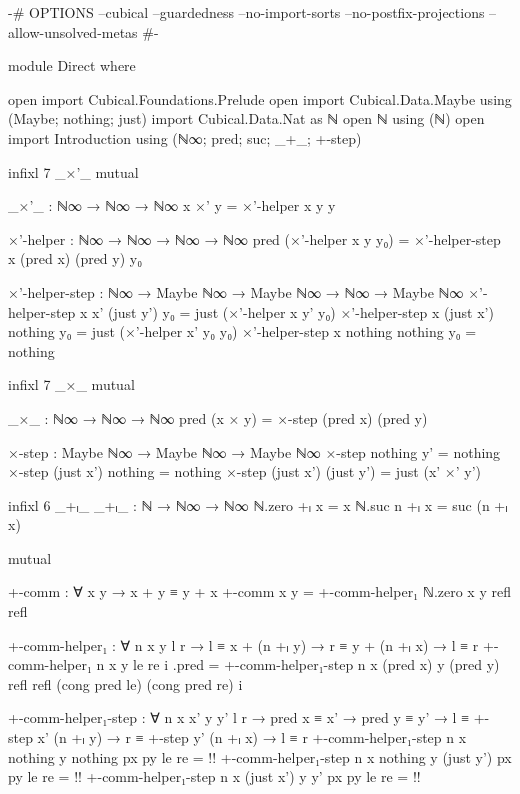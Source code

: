 \begin{code}[hide]
{-# OPTIONS --cubical --guardedness --no-import-sorts --no-postfix-projections --allow-unsolved-metas #-}

module Direct where

open import Cubical.Foundations.Prelude
open import Cubical.Data.Maybe using (Maybe; nothing; just)
import Cubical.Data.Nat as ℕ
open ℕ using (ℕ)
open import Introduction using (ℕ∞; pred; suc; _+_; +-step)
\end{code}
\begin{code}[hide]
infixl 7 _×'_
mutual
\end{code}
\begin{code}
  _×'_ : ℕ∞ → ℕ∞ → ℕ∞
  x ×' y = ×'-helper x y y

  ×'-helper : ℕ∞ → ℕ∞ → ℕ∞ → ℕ∞
  pred (×'-helper x y y₀) =
    ×'-helper-step x (pred x) (pred y) y₀

  ×'-helper-step :
    ℕ∞ → Maybe ℕ∞ → Maybe ℕ∞ → ℕ∞ →
    Maybe ℕ∞
  ×'-helper-step x x' (just y') y₀ =
    just (×'-helper x y' y₀)
  ×'-helper-step x (just x') nothing y₀ =
    just (×'-helper x' y₀ y₀)
  ×'-helper-step x nothing nothing y₀ =
    nothing
\end{code}

\begin{code}[hide]
infixl 7 _×_
mutual
\end{code}
\begin{code}
  _×_ : ℕ∞ → ℕ∞ → ℕ∞
  pred (x × y) = ×-step (pred x) (pred y)

  ×-step : Maybe ℕ∞ → Maybe ℕ∞ → Maybe ℕ∞
  ×-step nothing    y'         = nothing
  ×-step (just x')  nothing    = nothing
  ×-step (just x')  (just y')  = just (x' ×' y')
\end{code}

\begin{code}
infixl 6 _+ₗ_
_+ₗ_ : ℕ → ℕ∞ → ℕ∞
ℕ.zero +ₗ x = x
ℕ.suc n +ₗ x = suc (n +ₗ x)
\end{code}

\begin{code}[hide]
mutual
\end{code}
\begin{code}
  +-comm : ∀ x y → x + y ≡ y + x
  +-comm x y = +-comm-helper₁ ℕ.zero x y refl refl

  +-comm-helper₁ :
    ∀ n x y {l r} → l ≡ x + (n +ₗ y) → r ≡ y + (n +ₗ x) → l ≡ r
  +-comm-helper₁ n x y le re i .pred =
    +-comm-helper₁-step n x (pred x) y (pred y)
      refl refl (cong pred le) (cong pred re) i

  +-comm-helper₁-step :
    ∀ n x x' y y' {l r} →
    pred x ≡ x' → pred y ≡ y' →
    l ≡ +-step x' (n +ₗ y) → r ≡ +-step y' (n +ₗ x) →
    l ≡ r
  +-comm-helper₁-step n x nothing y nothing px py le re = {!!}
  +-comm-helper₁-step n x nothing y (just y') px py le re = {!!}
  +-comm-helper₁-step n x (just x') y y' px py le re = {!!}
\end{code}

